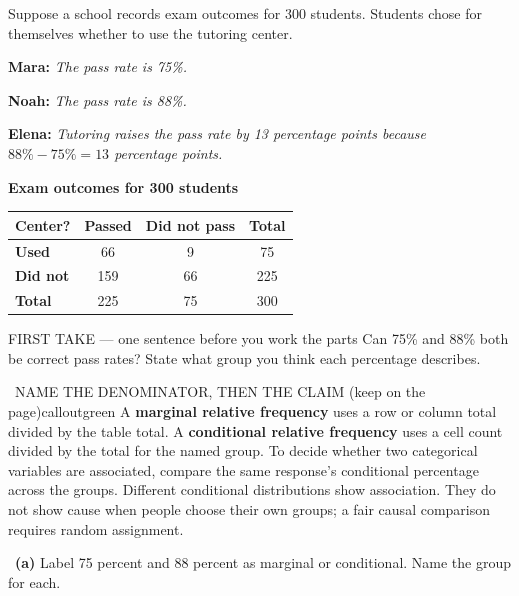 \documentclass[11pt]{article}
\begin{document}
\clearpage
{}

Suppose a school records exam outcomes for 300 students. Students chose for themselves whether to use the tutoring center.\par\smallskip \textbf{Mara:} \emph{The pass rate is 75\%.}\par \textbf{Noah:} \emph{The pass rate is 88\%.}\par \textbf{Elena:} \emph{Tutoring raises the pass rate by 13 percentage points because $88\%-75\%=13$ percentage points.}\par
\begin{center}
\textbf{Exam outcomes for 300 students}\par\smallskip
\begin{tabular}{|l|c|c|c|}
\hline
\textbf{Center?} & \textbf{Passed} & \textbf{Did not pass} & \textbf{Total} \\ \hline
\textbf{Used} & 66 & 9 & 75 \\ \hline
\textbf{Did not} & 159 & 66 & 225 \\ \hline
\textbf{Total} & 225 & 75 & 300 \\ \hline
\end{tabular}
\end{center}
\begin{firsttakebox}{FIRST TAKE --- one sentence before you work the parts}
Can 75\% and 88\% both be correct pass rates? State what group you think each percentage describes.\par
{}
\end{firsttakebox}

\begin{callout}{\IconBook\ NAME THE DENOMINATOR, THEN THE CLAIM (keep on the page)}{calloutgreen}
A \textbf{marginal relative frequency} uses a row or column total divided by the table total. A
\textbf{conditional relative frequency} uses a cell count divided by the total for the named group.
To decide whether two categorical variables are associated, compare the same response's conditional
percentage across the groups. Different conditional distributions show association. They do not show cause
when people choose their own groups; a fair causal comparison requires random assignment.
\end{callout}

~\textbf{(a)} Label 75 percent and 88 percent as marginal or conditional. Name the group for each.\par
{}
\end{document}
